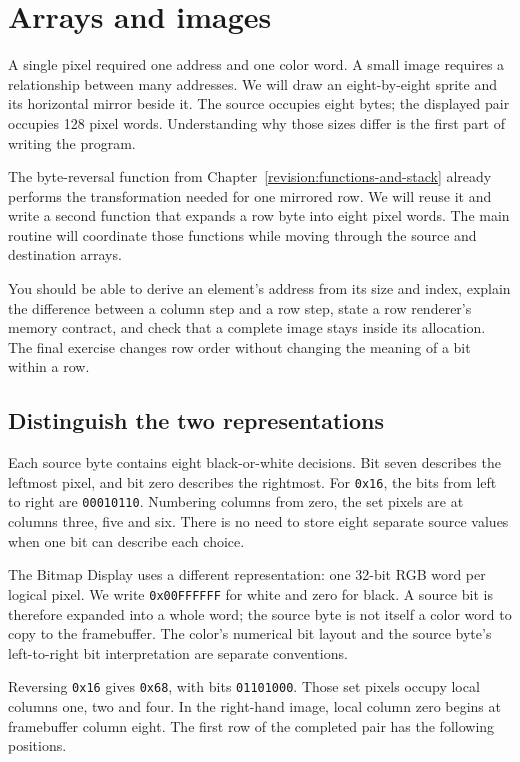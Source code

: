 \chapter{Arrays and images}
\label{revision:arrays-and-images}

A single pixel required one address and one color word. A small image requires a
relationship between many addresses. We will draw an eight-by-eight sprite and
its horizontal mirror beside it. The source occupies eight bytes; the displayed
pair occupies 128 pixel words. Understanding why those sizes differ is the first
part of writing the program.

The byte-reversal function from Chapter~\ref{revision:functions-and-stack} already
performs the transformation needed for one mirrored row. We will reuse it and
write a second function that expands a row byte into eight pixel words. The main
routine will coordinate those functions while moving through the source and
destination arrays.

You should be able to derive an element's address from its size and index, explain
the difference between a column step and a row step, state a row renderer's memory
contract, and check that a complete image stays inside its allocation. The final
exercise changes row order without changing the meaning of a bit within a row.

\section{Distinguish the two representations}

Each source byte contains eight black-or-white decisions. Bit seven describes
the leftmost pixel, and bit zero describes the rightmost. For \texttt{0x16}, the
bits from left to right are \texttt{00010110}. Numbering columns from zero, the
set pixels are at columns three, five and six. There is no need to store eight
separate source values when one bit can describe each choice.

The Bitmap Display uses a different representation: one 32-bit RGB word per
logical pixel. We write \texttt{0x00FFFFFF} for white and zero for black. A source
bit is therefore expanded into a whole word; the source byte is not itself a
color word to copy to the framebuffer. The color's numerical bit layout and the
source byte's left-to-right bit interpretation are separate conventions.

Reversing \texttt{0x16} gives \texttt{0x68}, with bits \texttt{01101000}. Those
set pixels occupy local columns one, two and four. In the right-hand image, local
column zero begins at framebuffer column eight. The first row of the completed
pair has the following positions.

